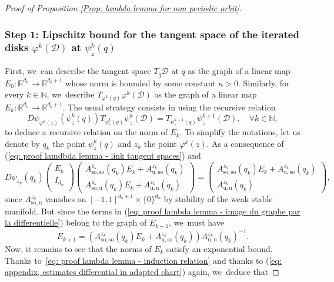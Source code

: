 \documentclass[11pt]{article}
\newcommand{\Subsubsection}{\subsubsection}
\newcommand{\rs}{\mathrm{s}}
\newcommand{\rso}{\mathrm{so}}
\newcommand{\ru}{\mathrm{u}}
\theoremstyle{definition}
\theoremstyle{plain}
\newcommand{\D}{\mathcal{D}}
\newcommand{\N}{\mathbb{N}}
\newcommand{\R}{\mathbb{R}}
\begin{document}
\begin{appendix}
\begin{proof}[Proof of Proposition \ref{Prop: lambda lemma for non periodic orbit}]
\Subsubsection*{Step 1: Lipschitz bound for the tangent space of the iterated disks $\varphi^k (\D)$ at $\psi_z^k (q)$}
First, we~can describe the tangent space $T_q \D$ at $q$ as the graph of a linear map $E_0: \R^{d_\ru} \to \R^{d_\rs + 1}$ whose norm is bounded by some constant $\kappa > 0$. Similarly, for every $k \in \N$, we~describe $T_{\varphi^k (q)} \varphi^k (\D)$ as the graph of a linear map $E_{k}: \R^{d_\ru} \to \R^{d_\rs +1}$. The usual strategy consists in using the recursive relation
\begin{equation}\label{eq: proof lamdbda lemma - link tangent spaces}
D \psi_{\varphi^k (z)} (\psi_{z}^k (q)) T_{\psi_{z}^k (q)} \psi_{z}^k (\D)
= T_{\psi_{z}^{k+1} (q)} \psi_{z}^{k+1}(\D), \quad \forall k \in \N,
\end{equation}
to deduce a recursive relation on the norm of $E_{k}$. To simplify the notations, let us denote by $q_k$ the point $\psi_{z}^k (q)$ and $z_k$ the point $\varphi^k (z)$. As a consequence of (\ref{eq: proof lamdbda lemma - link tangent spaces}) and
\begin{equation}\label{eq: proof lambda lemma - image du graphe par la differentielle}
D \psi_{z_k} (q_k) \begin{pmatrix}
E_k \\
I_{d_\ru} \\
\end{pmatrix}
\!\! \begin{pmatrix}
A_{\rso,\rso}^{z_k} (q_k) E_k+ A_{\ru,\rso}^{z_k} (q_k) \\
A_{\rso,\ru}^{z_k} (q_k) E_k + A_{\ru,\ru}^{z_k} (q_k)
\end{pmatrix}
\!=\! \begin{pmatrix}
A_{\rso,\rso}^{z_k} (q_k)E_k + A_{\ru,\rso}^{z_k} (q_k) \\
A_{\ru,\ru}^{z_k} (q_k)
\end{pmatrix}\!,
\end{equation}
since $ A_{\rso,\ru}^{z_k}$ vanishes on $[-1,1]^{d_\rs + 1}\times \{0\}^{d_\ru} $ by stability of the weak stable manifold. But since the terms in (\ref{eq: proof lambda lemma - image du graphe par la differentielle}) belong to the graph of $E_{k+1}$, we~must have
\begin{equation}\label{eq: proof lambda lemma - induction relation}
E_{k+1} = \left(A_{\rso,\rso}^{z_k} (q_k)E_k + A_{\ru,\rso}^{z_k} (q_k) \right) A_{\ru,\ru}^{z_k} (q_k)^{-1}.
\end{equation}
Now, it remains to see that the norms of $E_k$ satisfy an exponential bound. Thanks to~\eqref{eq: proof lambda lemma - induction relation} and thanks to (\ref{eq: appendix, estimates differential in adapted chart}) again, we~deduce that

\end{proof}
\end{appendix}
\end{document}
